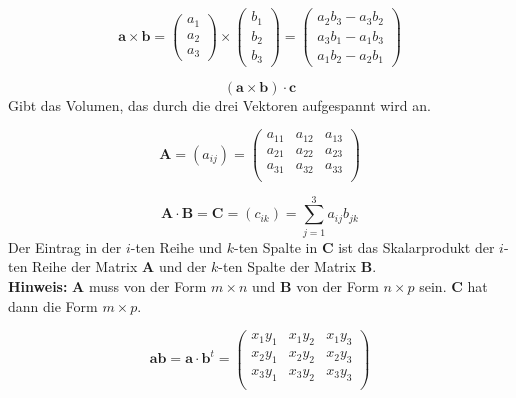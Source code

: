 \begin{frameddefn}[Kreuzprodukt]
	\[\mathbf{a}\times \mathbf{b} = 
	\left(\begin{array}{c} a_1 \\ a_2 \\ a_3 \end{array}  \right) \times \left(\begin{array}{c} b_1 \\ b_2 \\ b_3 \end{array}  \right) =
	\left(\begin{array}{c} a_2 b_3 - a_3 b_2 \\ a_3 b_1 - a_1 b_3\\ a_1 b_2 - a_2 b_1 \end{array}  \right)\]
\end{frameddefn}

\begin{frameddefn}[Spatprodukt]
	\[(\mathbf{a} \times \mathbf{b}) \cdot \mathbf{c} \]
	Gibt das Volumen, das durch die drei Vektoren aufgespannt wird an.
\end{frameddefn}

\begin{frameddefn}
	\[\mathbf{A} = (a_{ij}) = \left(\begin{array}{rrr} 
		a_{11} & a_{12} & a_{13} \\ 
		a_{21} & a_{22} & a_{23} \\ 
		a_{31} & a_{32} & a_{33} \\ 
	\end{array}\right)\]
\end{frameddefn}

\begin{frameddefn}[Matrixmultiplikation]
	\[\mathbf{A} \cdot \mathbf{B} = \mathbf{C} = (c_{ik}) = \sum_{j=1}^{3} a_{ij} b_{jk}\]
	Der Eintrag in der $i$-ten Reihe und $k$-ten Spalte in $\mathbf{C}$ ist das Skalarprodukt der $i$-ten Reihe der Matrix $\mathbf{A}$ und der $k$-ten Spalte der Matrix $\mathbf{B}$.\\
	\textbf{Hinweis:} $\mathbf{A}$ muss von der Form $m \times n$ und $\mathbf{B}$ von der Form $n \times p$ sein. $\mathbf{C}$ hat dann die Form $m \times p$.
\end{frameddefn}

\begin{frameddefn}
	\[\mathbf{a}\mathbf{b} = \mathbf{a} \cdot \mathbf{b}^t = 
	\left(\begin{array}{rrr} 
		x_1 y_1 & x_1 y_2 & x_1 y_3 \\ 
		x_2 y_1 & x_2 y_2 & x_2 y_3 \\ 
		x_3 y_1 & x_3 y_2 & x_3 y_3 \\ 
	\end{array}\right)
	\]
\end{frameddefn}

